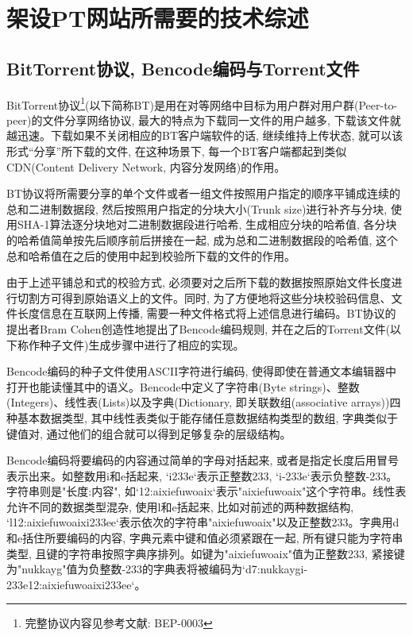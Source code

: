 \chapter{架设PT网站所需要的技术综述}

\section{BitTorrent协议, Bencode编码与Torrent文件}
\label{sec:BitorrentProtocol}

BitTorrent协议\footnote{完整协议内容见参考文献: BEP-0003\cite{bramcohen2008bep0003}}(以下简称BT)是用在对等网络中目标为用户群对用户群(Peer-to-peer)的文件分享网络协议, 最大的特点为下载同一文件的用户越多, 下载该文件就越迅速。下载如果不关闭相应的BT客户端软件的话, 继续维持上传状态, 就可以该形式``分享''所下载的文件, 在这种场景下, 每一个BT客户端都起到类似CDN(Content Delivery Network, 内容分发网络)的作用。

BT协议将所需要分享的单个文件或者一组文件按照用户指定的顺序平铺成连续的总和二进制数据段, 然后按照用户指定的分块大小(Trunk size)进行补齐与分块, 使用SHA-1算法逐分块地对二进制数据段进行哈希, 生成相应分块的哈希值, 各分块的哈希值简单按先后顺序前后拼接在一起, 成为总和二进制数据段的哈希值, 这个总和哈希值在之后的使用中起到校验所下载的文件的作用。

由于上述平铺总和式的校验方式, 必须要对之后所下载的数据按照原始文件长度进行切割方可得到原始语义上的文件。同时, 为了方便地将这些分块校验码信息、文件长度信息在互联网上传播, 需要一种文件格式将上述信息进行编码。BT协议的提出者Bram Cohen创造性地提出了Bencode编码规则, 并在之后的Torrent文件(以下称作种子文件)生成步骤中进行了相应的实现。

Bencode编码的种子文件使用ASCII字符进行编码, 使得即使在普通文本编辑器中打开也能读懂其中的语义。Bencode中定义了字符串(Byte strings)、整数(Integers)、线性表(Lists)以及字典(Dictionary, 即关联数组(associative arrays))四种基本数据类型, 其中线性表类似于能存储任意数据结构类型的数组, 字典类似于键值对, 通过他们的组合就可以得到足够复杂的层级结构。

Bencode编码将要编码的内容通过简单的字母对括起来, 或者是指定长度后用冒号表示出来。如整数用i和e括起来, `i233e`表示正整数233, `i-233e`表示负整数-233。字符串则是"长度:内容", 如`12:aixiefuwoaix`表示"aixiefuwoaix"这个字符串。线性表允许不同的数据类型混杂, 使用l和e括起来, 比如对前述的两种数据结构, `l12:aixiefuwoaixi\-233ee`表示依次的字符串"aixiefuwoaix"以及正整数233。字典用d和e括住所要编码的内容, 字典元素中键和值必须紧跟在一起, 所有键只能为字符串类型, 且键的字符串按照字典序排列。如键为"aixiefuwoaix"值为正整数233, 紧接键为"nukkayg"值为负整数-233的字典表将被编码为`d7:nukkaygi-233e12:aixiefuwoaixi233ee`。

